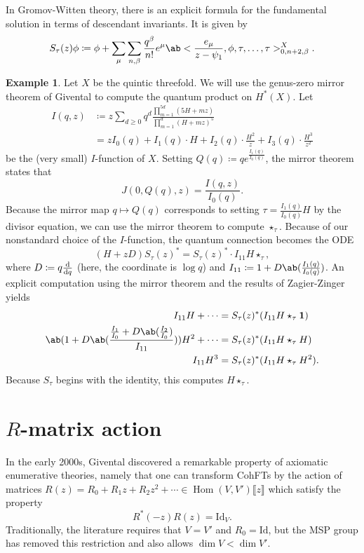 \documentclass{amsart}
\theoremstyle{definition}
\newtheorem{exm}[thm]{Example}
\theoremstyle{remark}
\theoremstyle{plain}
\theoremstyle{definition}
\theoremstyle{remark}
\newcommand{\mr}[1]{\mathrm{#1}}
\newcommand{\1}{\mathbf{1}}
\newcommand{\2}{\mathbf{2}}
\newcommand{\3}{\mathbf{3}}
\newcommand{\ps}[1]{\llbracket #1 \rrbracket}
\DeclareMathOperator{\Hom}{Hom}
\begin{document}
In Gromov-Witten theory, there is an explicit formula for the fundamental solution in terms of descendant invariants. It is given by
\[ S_{\tau}(z) \phi \coloneqq \phi + \sum_{\mu} \sum_{n,\beta} \frac{q^{\beta}}{n!} e^{\mu} \ab<\frac{e_{\mu}}{z-\psi_1}, \phi, \tau, \ldots, \tau>_{0,n+2,\beta}^{X}. \]

\begin{exm}
    Let $X$ be the quintic threefold. We will use the genus-zero mirror theorem of Givental to compute the quantum product on $H^*(X)$. Let
    \begin{align*}
        I(q,z) &\coloneqq z \sum_{d \geq 0} q^d \frac{\prod_{m=1}^{5d} (5H+mz)}{\prod_{m=1}^d (H+mz)^5}  \\
        &= z I_0(q) + I_1(q) \cdot H + I_2(q) \cdot \frac{H^2}{z} + I_3(q) \cdot \frac{H^3}{z^2}
    \end{align*}
    be the (very small) $I$-function of $X$. Setting $Q(q) \coloneqq q e^{\frac{I_1(q)}{I_0(q)}}$, the mirror theorem states that
    \[ J(0,Q(q),z) = \frac{I(q,z)}{I_0(q)}. \]
    Because the mirror map $q \mapsto Q(q)$ corresponds to setting $\tau = \frac{I_1(q)}{I_0(q)} H$ by the divisor equation, we can use the mirror theorem to compute $\star_{\tau}$. Because of our nonstandard choice of the $I$-function, the quantum connection becomes the ODE
    \[ (H+zD) S_{\tau}(z)^* = S_{\tau}(z)^* \cdot I_{11} H \star_{\tau}, \]
    where $D \coloneqq q \odv{}{q}$ (here, the coordinate is $\log q$) and $I_{11} \coloneqq 1 + D \ab(\frac{I_1(q)}{I_0(q)})$. An explicit computation using the mirror theorem and the results of Zagier-Zinger yields
    \begin{align*}
        I_{11} H + \cdots &= S_{\tau}(z)^* (I_{11} H \star_{\tau} \1) \\
        \ab( 1 + D\ab(\frac{\frac{I_1}{I_0} + D \ab(\frac{I_2}{I_0})}{I_{11}}) ) H^2 + \cdots &= S_{\tau}(z)^* (I_{11} H \star_{\tau} H) \\
        I_{11} H^3 &= S_{\tau}(z)^* (I_{11}H \star_{\tau} H^2).
    \end{align*}
    Because $S_{\tau}$ begins with the identity, this computes $H \star_{\tau}$.
\end{exm}


\section{$R$-matrix action}%
\label{sec:R-matrix action}

In the early 2000s, Givental discovered a remarkable property of axiomatic enumerative theories, namely that one can transform CohFTs by the action of matrices $R(z) = R_0 + R_1 z + R_2 z^2 + \cdots \in \Hom(V, V')\ps{z}$ which satisfy the property
\[ R^*(-z) R(z) = \mr{Id}_V. \]
Traditionally, the literature requires that $V = V'$ and $R_0 = \mr{Id}$, but the MSP group has removed this restriction and also allows $\dim V < \dim V'$.
\end{document}
